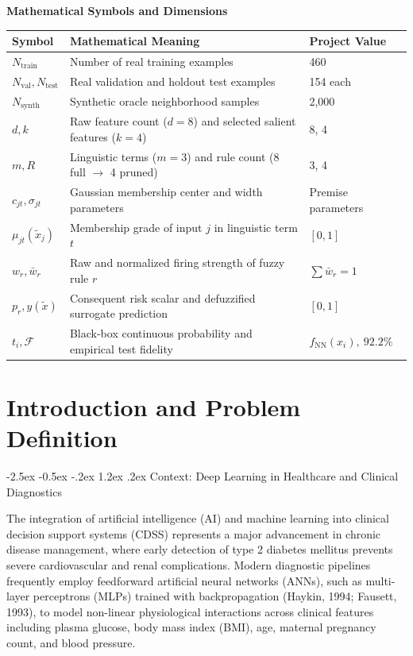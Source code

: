 \documentclass[12pt,a4paper,oneside]{report}
\makeatletter
\renewcommand\section{\@startsection {section}{1}{\z@}%
                                   {-2.5ex \@plus -0.5ex \@minus -.2ex}%
                                   {1.2ex \@plus .2ex}%
                                   {\normalfont\fontsize{13}{16}\selectfont\bfseries}}
\makeatother
\begin{document}
{\vspace{0.15cm}
\begin{center}
{\fontsize{11}{14}\selectfont \bfseries Mathematical Symbols and Dimensions}\\[0.15cm]
\footnotesize
\begin{tabularx}{\textwidth}{l X l}
\toprule
\textbf{Symbol} & \textbf{Mathematical Meaning} & \textbf{Project Value} \\
\midrule
$N_{\text{train}}$ & Number of real training examples & 460 \\
$N_{\text{val}}, N_{\text{test}}$ & Real validation and holdout test examples & 154 each \\
$N_{\text{synth}}$ & Synthetic oracle neighborhood samples & 2,000 \\
$d, k$ & Raw feature count ($d=8$) and selected salient features ($k=4$) & 8, 4 \\
$m, R$ & Linguistic terms ($m=3$) and rule count (8 full $\to$ 4 pruned) & 3, 4 \\
$c_{jt}, \sigma_{jt}$ & Gaussian membership center and width parameters & Premise parameters \\
$\mu_{jt}(\tilde{x}_j)$ & Membership grade of input $j$ in linguistic term $t$ & $[0, 1]$ \\
$w_r, \bar{w}_r$ & Raw and normalized firing strength of fuzzy rule $r$ & $\sum \bar{w}_r = 1$ \\
$p_r, y(\tilde{x})$ & Consequent risk scalar and defuzzified surrogate prediction & $[0, 1]$ \\
$t_i, \mathcal{F}$ & Black-box continuous probability and empirical test fidelity & $f_{\text{NN}}(x_i), \ 92.2\%$ \\
\bottomrule
\end{tabularx}
\end{center}
}

\clearpage
{}
\pagestyle{fancy}


\chapter{Introduction and Problem Definition}

\section{Context: Deep Learning in Healthcare and Clinical Diagnostics}

The integration of artificial intelligence (AI) and machine learning into clinical decision support systems (CDSS) represents a major advancement in chronic disease management, where early detection of type 2 diabetes mellitus prevents severe cardiovascular and renal complications. Modern diagnostic pipelines frequently employ feedforward artificial neural networks (ANNs), such as multi-layer perceptrons (MLPs) trained with backpropagation (Haykin, 1994; Fausett, 1993), to model non-linear physiological interactions across clinical features including plasma glucose, body mass index (BMI), age, maternal pregnancy count, and blood pressure.
\end{document}
